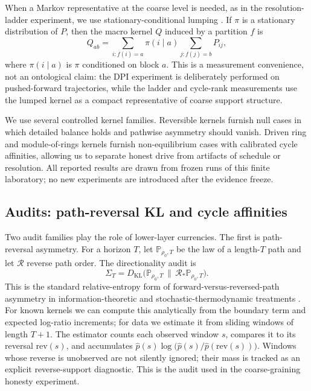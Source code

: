\documentclass[11pt,a4paper]{article}
\newcommand{\KL}{D_{\mathrm{KL}}}
\newcommand{\SigmaT}{\Sigma_T}
\begin{document}
When a Markov representative at the coarse level is needed, as in the resolution-ladder experiment, we use stationary-conditional lumping \cite{kemeny1960finite,buchholz1994lumpability}. If \(\pi\) is a stationary distribution of \(P\), then the macro kernel \(Q\) induced by a partition \(f\) is
\[
Q_{ab}=\sum_{i:f(i)=a}\pi(i\mid a)\sum_{j:f(j)=b} P_{ij},
\]
where \(\pi(i\mid a)\) is \(\pi\) conditioned on block \(a\). This is a measurement convenience, not an ontological claim: the DPI experiment is deliberately performed on pushed-forward trajectories, while the ladder and cycle-rank measurements use the lumped kernel as a compact representative of coarse support structure.

We use several controlled kernel families. Reversible kernels furnish null cases in which detailed balance holds and pathwise asymmetry should vanish. Driven ring and module-of-rings kernels furnish non-equilibrium cases with calibrated cycle affinities, allowing us to separate honest drive from artifacts of schedule or resolution. All reported results are drawn from frozen runs of this finite laboratory; no new experiments are introduced after the evidence freeze.

\subsection{Audits: path-reversal KL and cycle affinities}

Two audit families play the role of lower-layer currencies. The first is path-reversal asymmetry. For a horizon \(T\), let \(\mathbb{P}_{\rho_0,T}\) be the law of a length-\(T\) path and let \(\mathcal R\) reverse path order. The directionality audit is
\[
\SigmaT = \KL\!\big(\mathbb{P}_{\rho_0,T}\,\|\,\mathcal R_*\mathbb{P}_{\rho_0,T}\big).
\]
This is the standard relative-entropy form of forward-versus-reversed-path asymmetry in information-theoretic and stochastic-thermodynamic treatments \cite{kullback1951information,lebowitz1999gallavotti,seifert2005entropy}.
For known kernels we can compute this analytically from the boundary term and expected log-ratio increments; for data we estimate it from sliding windows of length \(T+1\). The estimator counts each observed window \(s\), compares it to its reversal \(\mathrm{rev}(s)\), and accumulates \(\hat p(s)\log\!\big(\hat p(s)/\hat p(\mathrm{rev}(s))\big)\). Windows whose reverse is unobserved are not silently ignored; their mass is tracked as an explicit reverse-support diagnostic. This is the audit used in the coarse-graining honesty experiment.
\end{document}
